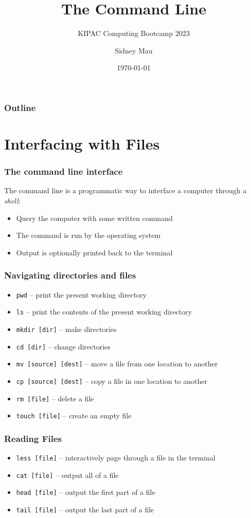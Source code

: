 \documentclass[aspectratio=169]{beamer}
\title{The Command Line}
\subtitle{KIPAC Computing Bootcamp 2023}
\author[S. Mau]{Sidney Mau}
\institute[Stanford]{Stanford University}
\date[\today]{\today}
\begin{document}

\frame{\titlepage}

\begin{frame}
	\frametitle{Outline}
	\tableofcontents
\end{frame}


\section{Interfacing with Files}

\frame{\sectionpage}

\begin{frame}
	\frametitle{The command line interface}
	The command line is a programmatic way to interface a computer through a \emph{shell}:
	\begin{itemize}
		\item Query the computer with some written command
		\item The command is run by the operating system
		\item Output is optionally printed back to the terminal
	\end{itemize}
\end{frame}

\begin{frame}
	\frametitle{Navigating directories and files}
	\begin{itemize}
		\item \texttt{pwd} -- print the present working directory
		\item \texttt{ls} -- print the contents of the present working directory
		\item \texttt{mkdir [dir]} -- make directories
		\item \texttt{cd [dir]} -- change directories
		\item \texttt{mv [source] [dest]} -- move a file from one location to another
		\item \texttt{cp [source] [dest]} -- copy a file in one location to another
		\item \texttt{rm [file]} -- delete a file
		\item \texttt{touch [file]} -- create an empty file
	\end{itemize}
\end{frame}

\begin{frame}
	\frametitle{Reading Files}
	\begin{itemize}
		\item \texttt{less [file]} -- interactively page through a file in the terminal
		\item \texttt{cat [file]} -- output all of a file
		\item \texttt{head [file]} -- output the first part of a file
		\item \texttt{tail [file]} -- output the last part of a file
	\end{itemize}
\end{frame}
\end{document}
